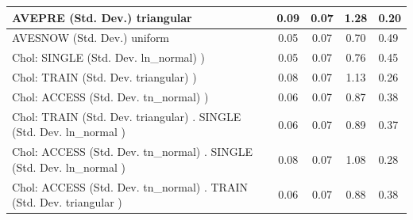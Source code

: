 \begin{table}
\begin{center}
\begin{tabular}{|l|l|c|c|c|l|}
			\hline
			AVEPRE (Std. Dev.) triangular &  & 0.09 & 0.07 & 1.28 & 0.20 \\
			\hline
			AVESNOW (Std. Dev.) uniform &  & 0.05 & 0.07 & 0.70 & 0.49 \\
			\hline
			 Chol: SINGLE (Std. Dev. ln_normal) ) &  & 0.05 & 0.07 & 0.76 & 0.45 \\
			\hline
			 Chol: TRAIN (Std. Dev. triangular) ) &  & 0.08 & 0.07 & 1.13 & 0.26 \\
			\hline
			 Chol: ACCESS (Std. Dev. tn_normal) ) &  & 0.06 & 0.07 & 0.87 & 0.38 \\
			\hline
			 Chol: TRAIN (Std. Dev. triangular) . SINGLE (Std. Dev.   ln_normal ) &  & 0.06 & 0.07 & 0.89 & 0.37 \\
			\hline
			 Chol: ACCESS (Std. Dev. tn_normal) . SINGLE (Std. Dev.   ln_normal ) &  & 0.08 & 0.07 & 1.08 & 0.28 \\
			\hline
			 Chol: ACCESS (Std. Dev. tn_normal) . TRAIN (Std. Dev.   triangular ) &  & 0.06 & 0.07 & 0.88 & 0.38 \\
			\hline
		\end{tabular}
	\end{center}
\end{table}